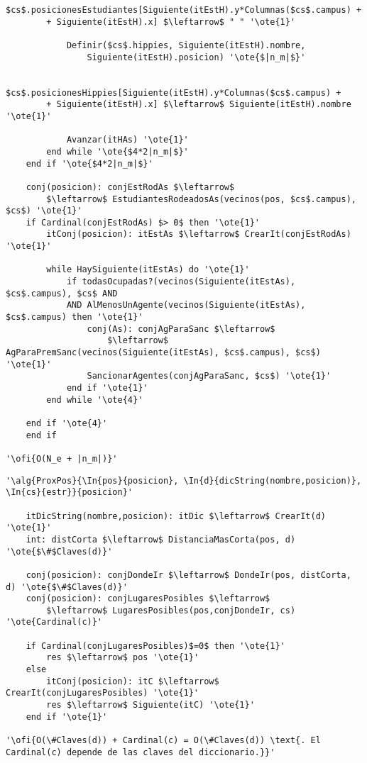 \begin{lstlisting}[mathescape]
			$cs$.posicionesEstudiantes[Siguiente(itEstH).y*Columnas($cs$.campus) +
		+ Siguiente(itEstH).x] $\leftarrow$ " " '\ote{1}'

			Definir($cs$.hippies, Siguiente(itEstH).nombre,
				Siguiente(itEstH).posicion) '\ote{$|n_m|$}'

			$cs$.posicionesHippies[Siguiente(itEstH).y*Columnas($cs$.campus) +
		+ Siguiente(itEstH).x] $\leftarrow$ Siguiente(itEstH).nombre '\ote{1}'

			Avanzar(itHAs) '\ote{1}'
		end while '\ote{$4*2|n_m|$}'
	end if '\ote{$4*2|n_m|$}'

	conj(posicion): conjEstRodAs $\leftarrow$
		$\leftarrow$ EstudiantesRodeadosAs(vecinos(pos, $cs$.campus), $cs$) '\ote{1}'
	if Cardinal(conjEstRodAs) $> 0$ then '\ote{1}'
		itConj(posicion): itEstAs $\leftarrow$ CrearIt(conjEstRodAs) '\ote{1}'

		while HaySiguiente(itEstAs) do '\ote{1}'
			if todasOcupadas?(vecinos(Siguiente(itEstAs), $cs$.campus), $cs$ AND
			AND AlMenosUnAgente(vecinos(Siguiente(itEstAs), $cs$.campus) then '\ote{1}'
				conj(As): conjAgParaSanc $\leftarrow$
					$\leftarrow$ AgParaPremSanc(vecinos(Siguiente(itEstAs), $cs$.campus), $cs$) '\ote{1}'
				SancionarAgentes(conjAgParaSanc, $cs$) '\ote{1}'
			end if '\ote{1}'
		end while '\ote{4}'

	end if '\ote{4}'
	end if

'\ofi{O(N_e + |n_m|)}'
\end{lstlisting}

\begin{lstlisting}[mathescape]
'\alg{ProxPos}{\In{pos}{posicion}, \In{d}{dicString(nombre,posicion)}, \In{cs}{estr}}{posicion}'
	
	itDicString(nombre,posicion): itDic $\leftarrow$ CrearIt(d) '\ote{1}'
	int: distCorta $\leftarrow$ DistanciaMasCorta(pos, d) '\ote{$\#$Claves(d)}'

	conj(posicion): conjDondeIr $\leftarrow$ DondeIr(pos, distCorta, d) '\ote{$\#$Claves(d)}'
	conj(posicion): conjLugaresPosibles $\leftarrow$ 
		$\leftarrow$ LugaresPosibles(pos,conjDondeIr, cs) '\ote{Cardinal(c)}'

	if Cardinal(conjLugaresPosibles)$=0$ then '\ote{1}'
		res $\leftarrow$ pos '\ote{1}'
	else
		itConj(posicion): itC $\leftarrow$ CrearIt(conjLugaresPosibles) '\ote{1}'
		res $\leftarrow$ Siguiente(itC) '\ote{1}'
	end if '\ote{1}'

'\ofi{O(\#Claves(d)) + Cardinal(c) = O(\#Claves(d)) \text{. El Cardinal(c) depende de las claves del diccionario.}}'
\end{lstlisting}

